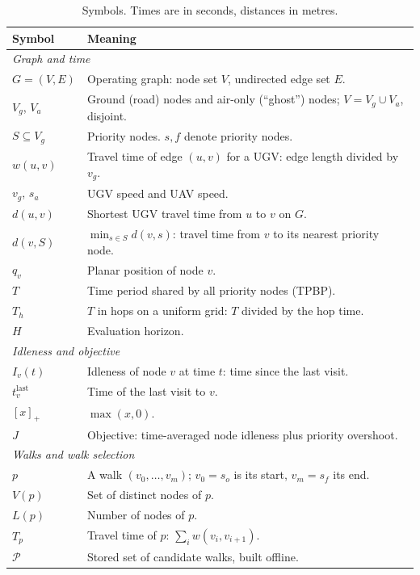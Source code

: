 \documentclass[11pt]{article}
\newcommand{\pos}[1]{[#1]_+}
\theoremstyle{definition}
\theoremstyle{plain}
\begin{document}
\begin{table}[H]
\centering
\small
\caption{Symbols. Times are in seconds, distances in metres.}
\label{tab:notation}
\begin{tabularx}{\linewidth}{lX}
\toprule
Symbol & Meaning \\
\midrule
\multicolumn{2}{l}{\textit{Graph and time}} \\
$G = (V, E)$ & Operating graph: node set $V$, undirected edge set $E$. \\
$V_g$, $V_a$ & Ground (road) nodes and air-only (``ghost'') nodes; $V = V_g \cup V_a$, disjoint. \\
$S \subseteq V_g$ & Priority nodes. $s, f$ denote priority nodes. \\
$w(u, v)$ & Travel time of edge $(u,v)$ for a UGV: edge length divided by $v_g$. \\
$v_g$, $s_a$ & UGV speed and UAV speed. \\
$d(u, v)$ & Shortest UGV travel time from $u$ to $v$ on $G$. \\
$d(v, S)$ & $\min_{s \in S} d(v, s)$: travel time from $v$ to its nearest priority node. \\
$q_v$ & Planar position of node $v$. \\
$T$ & Time period shared by all priority nodes (TPBP). \\
$T_h$ & $T$ in hops on a uniform grid: $T$ divided by the hop time. \\
$H$ & Evaluation horizon. \\
\multicolumn{2}{l}{\textit{Idleness and objective}} \\
$I_v(t)$ & Idleness of node $v$ at time $t$: time since the last visit. \\
$t_v^{\mathrm{last}}$ & Time of the last visit to $v$. \\
$\pos{x}$ & $\max(x, 0)$. \\
$J$ & Objective: time-averaged node idleness plus priority overshoot. \\
\multicolumn{2}{l}{\textit{Walks and walk selection}} \\
$p$ & A walk $(v_0, \ldots, v_m)$; $v_0 = s_o$ is its start, $v_m = s_f$ its end. \\
$V(p)$ & Set of distinct nodes of $p$. \\
$L(p)$ & Number of nodes of $p$. \\
$T_p$ & Travel time of $p$: $\sum_{i} w(v_i, v_{i+1})$. \\
$\mathcal{P}$ & Stored set of candidate walks, built offline. \\

\end{tabularx}
\end{table}
\end{document}
